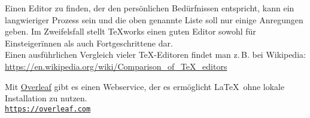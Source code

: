 \documentclass[
	ausgabe=2022-02-07,
	titel=Installationshinweise,
	shortverb=true,
]{../tex/latexkurs-exercise}
\begin{document}
\noindent Einen Editor zu finden, der den persönlichen Bedürfnissen entspricht, kann ein langwieriger Prozess sein und die oben genannte Liste soll nur einige Anregungen geben. Im Zweifelsfall stellt \TeX works  einen guten Editor sowohl für Einsteigerïnnen als auch Fortgeschrittene dar.\\Einen ausführlichen Vergleich vieler \TeX-Editoren findet man z.\,B. bei Wikipedia:\\ \url{https://en.wikipedia.org/wiki/Comparison_of_TeX_editors}

Mit \href{https://qn3.de/tex00}{Overleaf}  gibt es einen Webservice, der es ermöglicht \LaTeX\ ohne lokale Installation zu nutzen.\\ \href{https://qn3.de/tex00}{\texttt{https://overleaf.com}}
\end{document}
